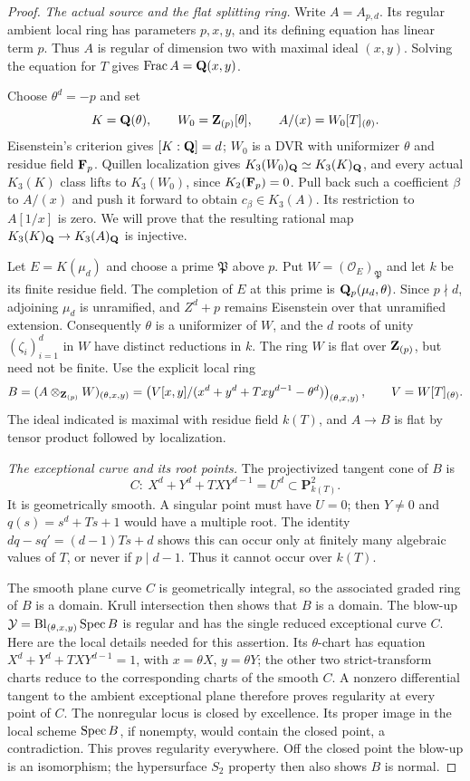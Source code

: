 \begin{proof}
\emph{The actual source and the flat splitting ring.}
Write $A=A_{p,d}$. Its regular ambient local ring has parameters
$p,x,y$, and its defining equation has linear term $p$.
Thus $A$ is regular of dimension two with maximal ideal $(x,y)$.
Solving the equation for $T$ gives $\operatorname{Frac} A=\mathbf Q(x,y)$.

Choose $\theta^d=-p$ and set
\[
 K=\mathbf Q(\theta),\qquad W_0=\mathbf Z_{(p)}[\theta],\qquad
 A/(x)=W_0[T]_{(\theta)}.
\]
Eisenstein's criterion gives $[K:\mathbf Q]=d$; $W_0$ is a DVR with
uniformizer $\theta$ and residue field $\mathbf F_p$.
Quillen localization gives
$K_3(W_0)_{\mathbf Q}\simeq K_3(K)_{\mathbf Q}$, and every actual
$K_3(K)$ class lifts to $K_3(W_0)$, since $K_2(\mathbf F_p)=0$.
Pull back such a coefficient $\beta$ to $A/(x)$ and push it
forward to obtain $c_\beta\in K_3(A)$. Its restriction to
$A[1/x]$ is zero. We will prove that the resulting rational map
$K_3(K)_{\mathbf Q}\to K_3(A)_{\mathbf Q}$ is injective.

Let $E=K(\mu_d)$ and choose a prime $\mathfrak P$ above $p$.
Put $W=(\mathcal O_E)_{\mathfrak P}$ and let $k$ be its finite
residue field. The completion of $E$ at this prime is
$\mathbf Q_p(\mu_d,\theta)$. Since $p\nmid d$, adjoining $\mu_d$
is unramified, and $Z^d+p$ remains Eisenstein over that
unramified extension. Consequently $\theta$ is a uniformizer
of $W$, and the $d$ roots of unity $(\zeta_i)_{i=1}^d$ in $W$ have distinct
reductions in $k$.
The ring $W$ is flat over $\mathbf Z_{(p)}$, but need not be finite.
Use the explicit local ring
\[
 B=(A\otimes_{\mathbf Z_{(p)}}W)_{(\theta,x,y)}
  =\left(V[x,y]/
      (x^d+y^d+Txy^{d-1}-\theta^d)\right)_{(\theta,x,y)},
 \qquad V=W[T]_{(\theta)}.
\]
The ideal indicated is maximal with residue field $k(T)$, and
$A\to B$ is flat by tensor product followed by localization.

\emph{The exceptional curve and its root points.}
The projectivized tangent cone of $B$ is
\[
 C:\ X^d+Y^d+TXY^{d-1}=U^d
       \subset\mathbf P^2_{k(T)}.
\]
It is geometrically smooth. A singular point must have $U=0$;
then $Y\ne0$ and $q(s)=s^d+Ts+1$ would have a multiple root.
The identity $dq-sq'=(d-1)Ts+d$ shows this can occur only at
finitely many algebraic values of $T$, or never if $p\mid d-1$.
Thus it cannot occur over $k(T)$.

The smooth plane curve $C$ is geometrically integral, so the
associated graded ring of $B$ is a domain. Krull intersection
then shows that $B$ is a domain. The blow-up
$\mathcal Y=\operatorname{Bl}_{(\theta,x,y)}\operatorname{Spec} B$
is regular and has the single reduced exceptional curve $C$.
Here are the local details needed for this assertion. Its
$\theta$-chart has equation
$X^d+Y^d+TXY^{d-1}=1$, with $x=\theta X$, $y=\theta Y$;
the other two strict-transform charts reduce to the corresponding
charts of the smooth $C$. A nonzero differential tangent to
the ambient exceptional plane therefore proves regularity at
every point of $C$. The nonregular locus is closed by excellence.
Its proper image in the local scheme $\operatorname{Spec} B$, if nonempty,
would contain the closed point, a contradiction. This proves
regularity everywhere.
Off the closed point the blow-up is an isomorphism; the
hypersurface $S_2$ property then also shows $B$ is normal.


\end{proof}
